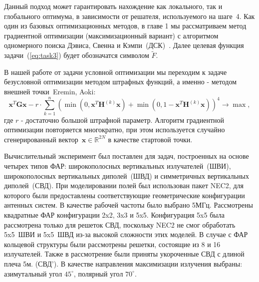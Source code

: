 Данный подход может гарантировать нахождение как локального, так и глобального оптимума, в зависимости от решателя, используемого на шаге~4. Как один из базовых оптимизационных методов, в главе 1 мы рассматриваем метод градиентной оптимизации (максимизационный вариант)
с алгоритмом одномерного поиска Дэвиса, Свенна и Кэмпи~(ДСК)~. Далее целевая функция задачи~(\ref{eq:task3}) будет обозначатся символом $\tilde{F}$.

В нашей работе от задачи условной оптимизации мы переходим к задаче безусловной оптимизации методом штрафных функций, а именно -
методом внешней точки~\autocite{eremin:convex,aoki:mo}{Eremin, Aoki}:
\begin{equation}
       \textbf{x}^{T}\textbf{Gx} - r\cdot \sum_{k=1}^n
       \left( \min\left(0,\textbf{x}^{T}\textbf{H}^{(k)}\textbf{x}\right) +
       \min\left(0,1-\textbf{x}^{T}\textbf{H}^{(k)}\textbf{x}\right)\right)^4 \rightarrow
       \max,
     \label{eq:task4}
\end{equation}
где $r$ - достаточно большой штрафной параметр. Алгоритм градиентной оптимизации повторяется многократно, при этом используется случайно сгенерированный вектор~$\textbf{x}\in \mathbb{R}^{2N}$ в качестве стартовой точки.

Вычислительный эксперимент был поставлен для задач, построенных на основе четырех типов ФАР: широкополосных вертикальных излучателей~(ШВИ), широкополосных вертикальных диполей~(ШВД) и симметричных вертикальных диполей~(СВД). При моделировании полей был использован пакет NEC2, для которого были предоставлены соответствующие геометрические конфигурации антенных систем. В качестве рабочей частоты было выбрано 5МГц. Рассмотрены квадратные ФАР конфигурации 2x2, 3x3 и 5x5. Конфигурация 5x5 была рассмотрена только для решеток СВД, поскольку NEC2 не смог обработать 5x5~ШВИ и 5x5~ШВД из-за высокой сложности этих моделей. В случае с ФАР кольцевой структуры были рассмотрены решетки, состоящие из 8 и 16 излучателей. Также в рассмотрение были приняты укороченные СВД с длиной плеча 5м. (СВД'). В качестве направления максимизации излучения выбраны: азимутальный угол $45^{\circ}$, полярный угол $70^{\circ}$.

